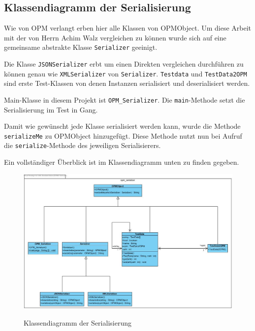 
\subsection{Klassendiagramm der Serialisierung}

Wie von OPM verlangt erben hier alle Klassen von OPMObject. Um diese Arbeit mit der von Herrn Achim Walz vergleichen zu k\"onnen wurde sich auf eine gemeinsame abstrakte Klasse \texttt{Serializer} geeinigt. 

Die Klasse \texttt{JSONSerializer} erbt um einen Direkten vergleichen durchf\"uhren zu k\"onnen genau wie \texttt{XMLSerializer} von \texttt{Serializer}.
\texttt{Testdata} und \texttt{TestData2OPM} sind erste Test-Klassen von denen Instanzen serialisiert und deserialisiert werden.

Main-Klasse in diesem Projekt ist \texttt{OPM\_Serializer}. Die \texttt{main}-Methode setzt die Serialisierung im Test in Gang.

Damit wie gew\"unscht jede Klasse serialisiert werden kann, wurde die Methode \texttt{serializeMe} zu OPMObject hinzugef\"ugt.
Diese Methode nutzt nun bei Aufruf die \texttt{serialize}-Methode des jeweiligen Serialisierers.

Ein vollst\"andiger \"Uberblick ist im Klassendiagramm unten zu finden gegeben.


\FloatBarrier
\begin{figure}[ht]
\includegraphics[width=16cm]{Bilder/Erstes_EKD}
\label{Klassendiagramm der Serialisierung}
\caption{Klassendiagramm der Serialisierung} 
\end{figure}




